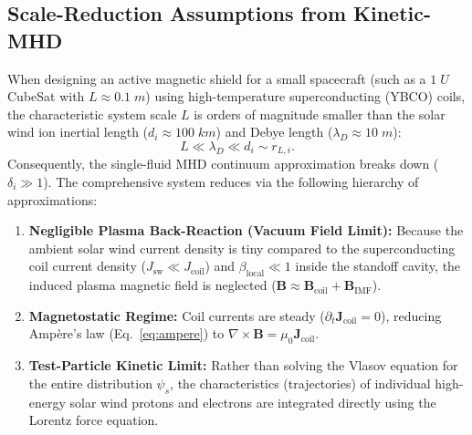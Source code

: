 \documentclass[11pt,a4paper]{article}
\newcommand{\vect}[1]{\bm{#1}}
\begin{document}
\subsection{Scale-Reduction Assumptions from Kinetic-MHD}
When designing an active magnetic shield for a small spacecraft (such as a $1\;\si{U}$ CubeSat with $L \approx 0.1\;\si{m}$) using high-temperature superconducting (YBCO) coils, the characteristic system scale $L$ is orders of magnitude smaller than the solar wind ion inertial length ($d_i \approx 100\;\si{km}$) and Debye length ($\lambda_D \approx 10\;\si{m}$):
\begin{equation}
    L \ll \lambda_D \ll d_i \sim r_{L,i}.
\end{equation}
Consequently, the single-fluid MHD continuum approximation breaks down ($\delta_i \gg 1$). The comprehensive system reduces via the following hierarchy of approximations:
\begin{enumerate}
    \item \textbf{Negligible Plasma Back-Reaction (Vacuum Field Limit):} Because the ambient solar wind current density is tiny compared to the superconducting coil current density ($J_{\text{sw}} \ll J_{\text{coil}}$) and $\beta_{\text{local}} \ll 1$ inside the standoff cavity, the induced plasma magnetic field is neglected ($\vect{B} \approx \vect{B}_{\text{coil}} + \vect{B}_{\text{IMF}}$).
    \item \textbf{Magnetostatic Regime:} Coil currents are steady ($\partial_t \vect{J}_{\text{coil}} = 0$), reducing Ampère's law (Eq.~\ref{eq:ampere}) to $\nabla \times \vect{B} = \mu_0 \vect{J}_{\text{coil}}$.
    \item \textbf{Test-Particle Kinetic Limit:} Rather than solving the Vlasov equation for the entire distribution $\psi_s$, the characteristics (trajectories) of individual high-energy solar wind protons and electrons are integrated directly using the Lorentz force equation.
\end{enumerate}
\end{document}
